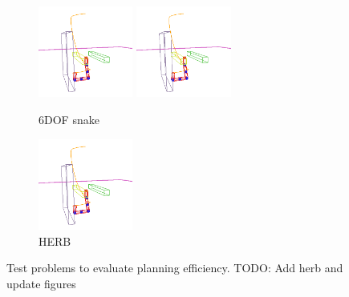 \documentclass[letterpaper, 10 pt, conference]{ieeeconf}  %
\begin{document}
\begin{figure}[t!]
\begin{subfigure}[b]{\textwidth}
		\includegraphics[height=3cm]{fig/planning_efficiency/6dof_example}
		\includegraphics[height=3cm]{fig/planning_efficiency/6dof_example}
		\caption{6DOF snake}
		\label{fig:planning_efficiency:6dof:example}
	\end{subfigure}
	\begin{subfigure}[b]{\textwidth}
    \centering
    \includegraphics[height=3cm]{fig/planning_efficiency/6dof_example}
	\caption{HERB}
	\label{fig:planning_efficiency:6dof:example}
	\end{subfigure}
	\caption{Test problems to evaluate planning efficiency. TODO: Add herb and update figures}
	\label{fig:problems}
\end{figure} 
\end{document}
